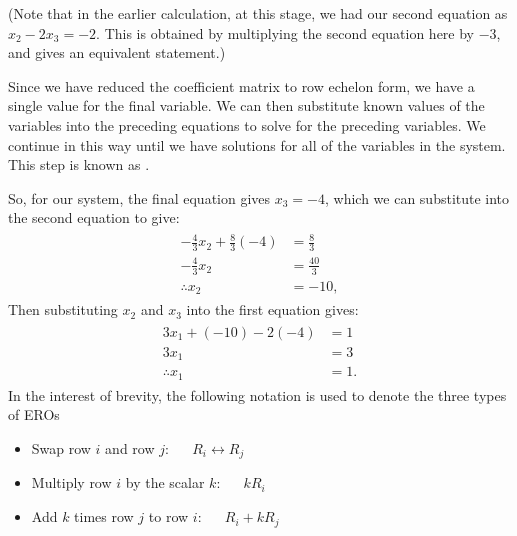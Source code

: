 \documentclass[letterpaper,10pt,english]{jupyterBook}
\begin{document}
\sphinxAtStartPar
(Note that in the earlier calculation, at this stage, we had our second equation as \(x_2 - 2 x_3 = -2\). This is obtained by multiplying the second equation here by \(-3\), and gives an equivalent statement.)

\ignorespaces 
\sphinxAtStartPar
Since we have reduced the coefficient matrix to row echelon form, we have a single value for the final variable. We can then substitute known values of the variables into the preceding equations to solve for the preceding variables. We continue in this way until we have solutions for all of the variables in the system. This step is known as .

\sphinxAtStartPar
So, for our system, the final equation gives \(x_3=-4\), which we can substitute into the second equation to give:
\begin{equation*}
\begin{split} \begin{align*}
    -\frac{4}{3} x_2 + \frac{8}{3} (-4) &= \frac{8}{3} \\
    -\frac{4}{3} x_2 &= \frac{40}{3} \\
    \therefore x_2 &= -10,
\end{align*} \end{split}
\end{equation*}
\sphinxAtStartPar
Then substituting \(x_2\) and \(x_3\) into the first equation gives:
\begin{equation*}
\begin{split} \begin{align*}
    3x_1 + (-10) - 2(-4) &= 1 \\
    3x_1 &= 3 \\
    \therefore x_1 &= 1.
\end{align*} \end{split}
\end{equation*}
\sphinxAtStartPar
In the interest of brevity, the following notation is used to denote the three types of EROs
\begin{itemize}
\item {} 
\sphinxAtStartPar
Swap row \(i\) and row \(j\):   \(R_i \leftrightarrow R_j\)

\item {} 
\sphinxAtStartPar
Multiply row \(i\) by the scalar \(k\):     \(kR_i\)

\item {} 
\sphinxAtStartPar
Add \(k\) times row \(j\) to row \(i\):    \(R_i + kR_j\)

\end{itemize}
\end{document}
